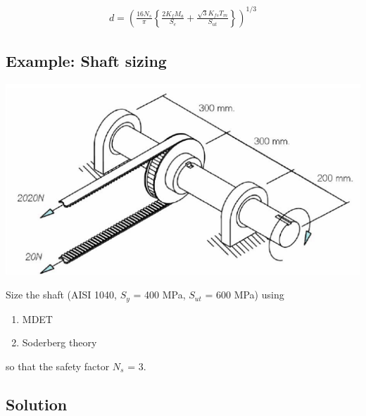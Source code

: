 \documentclass[a4paper,openany]{tufte-book}
\begin{document}
\begin{align}
  d = \left( \frac{16N_s}{\pi} \left\{ \frac{2 K_f M_a}{S_e} + \frac{\sqrt{3} K_{fs} T_m}{S_{ut}} \right\} \right)^{1/3}\end{align}

\subsection{Example: Shaft sizing}
\label{sec:org4c73d25}

\begin{center}
\includegraphics[width=.9\linewidth]{./pictures/Shafts/shaft-sizing.png}
\end{center}

Size the shaft (AISI 1040, \(S_{y}\) = 400 MPa, \(S_{ut}\) = 600 MPa)
using

\begin{enumerate}
\item MDET

\item Soderberg theory
\end{enumerate}

so that the safety factor \(N_{s}\) = 3.

\subsection{Solution}
\label{sec:org3c31a0a}
\end{document}
